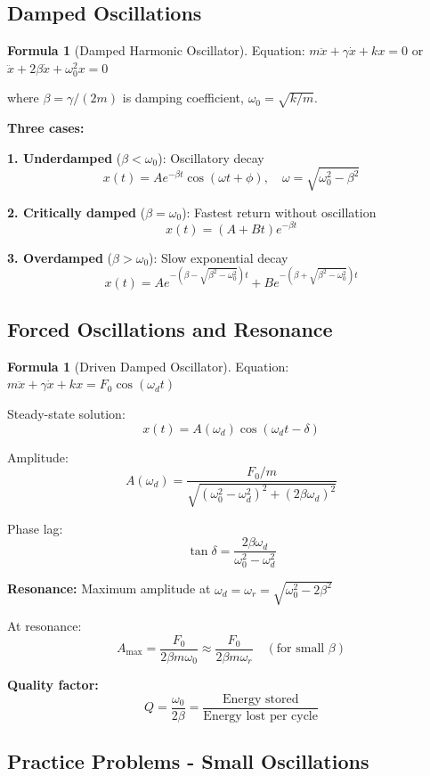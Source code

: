 \documentclass[12pt,a4paper]{article}
\theoremstyle{definition}
\newtheorem{formula}[theorem]{Formula}
\begin{document}
\subsection{Damped Oscillations}

\begin{formula}[Damped Harmonic Oscillator]
Equation: $m\ddot{x} + \gamma\dot{x} + kx = 0$ or $\ddot{x} + 2\beta\dot{x} + \omega_0^2 x = 0$

where $\beta = \gamma/(2m)$ is damping coefficient, $\omega_0 = \sqrt{k/m}$.

\textbf{Three cases:}

\textbf{1. Underdamped} ($\beta < \omega_0$): Oscillatory decay
\[
x(t) = Ae^{-\beta t}\cos(\omega t + \phi), \quad \omega = \sqrt{\omega_0^2 - \beta^2}
\]

\textbf{2. Critically damped} ($\beta = \omega_0$): Fastest return without oscillation
\[
x(t) = (A + Bt)e^{-\beta t}
\]

\textbf{3. Overdamped} ($\beta > \omega_0$): Slow exponential decay
\[
x(t) = Ae^{-(\beta - \sqrt{\beta^2 - \omega_0^2})t} + Be^{-(\beta + \sqrt{\beta^2 - \omega_0^2})t}
\]
\end{formula}

\subsection{Forced Oscillations and Resonance}

\begin{formula}[Driven Damped Oscillator]
Equation: $m\ddot{x} + \gamma\dot{x} + kx = F_0\cos(\omega_d t)$

Steady-state solution:
\[
x(t) = A(\omega_d)\cos(\omega_d t - \delta)
\]

Amplitude:
\[
A(\omega_d) = \frac{F_0/m}{\sqrt{(\omega_0^2 - \omega_d^2)^2 + (2\beta\omega_d)^2}}
\]

Phase lag:
\[
\tan\delta = \frac{2\beta\omega_d}{\omega_0^2 - \omega_d^2}
\]

\textbf{Resonance:} Maximum amplitude at $\omega_d = \omega_r = \sqrt{\omega_0^2 - 2\beta^2}$

At resonance:
\[
A_{\max} = \frac{F_0}{2\beta m\omega_0} \approx \frac{F_0}{2\beta m\omega_r} \quad (\text{for small } \beta)
\]

\textbf{Quality factor:}
\[
Q = \frac{\omega_0}{2\beta} = \frac{\text{Energy stored}}{\text{Energy lost per cycle}}
\]
\end{formula}

\subsection{Practice Problems - Small Oscillations}
\end{document}
